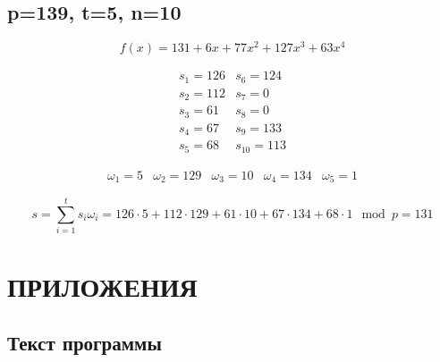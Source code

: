 \documentclass[a4paper,12pt]{article}
\begin{document}
	\subsection{p=139, t=5, n=10}
	
	\[
	f(x) = 131 + 6 x + 77 x^2 + 127 x^3 + 63 x^4
	\]
	
	\[
\begin{array}{cc}	
	
	s_1 = 126	&	s_6 = 124 \\
	s_2 = 112	&	s_7 = 0	  \\
	s_3 = 61	&	s_8 = 0	  \\
	s_4 = 67	&	s_9 = 133 \\
	s_5 = 68	&	s_{10} = 113
	
\end{array}		
\]
	
	\[
	\begin{array}{ccccc}	
		\omega_1 = 5 & \omega_2 = 129 & \omega_3 = 10 & \omega_4 = 134 & \omega_5 = 1
	\end{array}		
	\]
	
	\[
		s = \sum_{i=1}^{t} s_i \omega_i = 126\cdot 5 + 112 \cdot 129 + 61 \cdot 10 + 67 \cdot 134 + 68 \cdot 1 \mod p = 131
	\]
	
	\newpage
	\renewcommand\thesubsection{\Asbuk{subsection}}
	
	\section*{ПРИЛОЖЕНИЯ}
		\subsection{Текст программы} \label{program}
	

	
		
\end{document}
